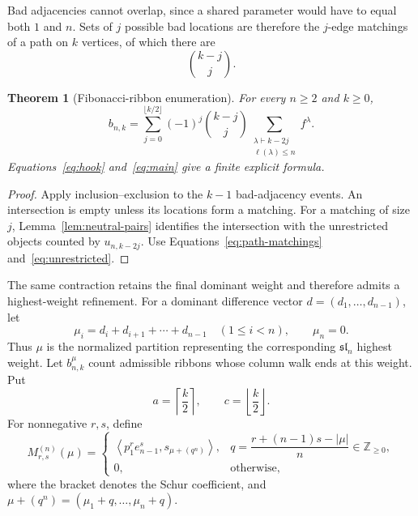 \documentclass[11pt]{article}
\newtheorem{theorem}{Theorem}[section]
\theoremstyle{definition}
\newcommand{\ellp}{\ell}
\begin{document}
Bad adjacencies cannot overlap, since a shared parameter would have to equal
both $1$ and $n$.  Sets of $j$ possible bad locations are therefore the
$j$-edge matchings of a path on $k$ vertices, of which there are
\begin{equation}\label{eq:path-matchings}
 \binom{k-j}{j}.
\end{equation}

\begin{theorem}[Fibonacci-ribbon enumeration]\label{thm:main}
For every $n\ge2$ and $k\ge0$,
\begin{equation}\label{eq:main}
 \boxed{
 b_{n,k}=\sum_{j=0}^{\lfloor k/2\rfloor}(-1)^j
 \binom{k-j}{j}
 \sum_{\substack{\lambda\vdash k-2j\\\ellp(\lambda)\le n}}f^\lambda.}
\end{equation}
Equations~\eqref{eq:hook} and~\eqref{eq:main} give a finite explicit formula.
\end{theorem}

\begin{proof}
Apply inclusion--exclusion to the $k-1$ bad-adjacency events.  An intersection
is empty unless its locations form a matching.  For a matching of size $j$,
Lemma~\ref{lem:neutral-pairs} identifies the intersection with the
unrestricted objects counted by $u_{n,k-2j}$.  Use
Equations~\eqref{eq:path-matchings} and~\eqref{eq:unrestricted}.
\end{proof}

The same contraction retains the final dominant weight and therefore admits
a highest-weight refinement.  For a dominant difference vector
$d=(d_1,\ldots,d_{n-1})$, let
\[
 \mu_i=d_i+d_{i+1}+\cdots+d_{n-1}\quad(1\le i<n),
 \qquad \mu_n=0.
\]
Thus $\mu$ is the normalized partition representing the corresponding
$\mathfrak{sl}_n$ highest weight.  Let $b_{n,k}^{\mu}$ count admissible
ribbons whose column walk ends at this weight.  Put
\[
 a=\left\lceil\frac{k}{2}\right\rceil,
 \qquad c=\left\lfloor\frac{k}{2}\right\rfloor.
\]
For nonnegative $r,s$, define
\begin{equation}\label{eq:mixed-schur-multiplicity}
 M_{r,s}^{(n)}(\mu)=
 \begin{cases}
 \left\langle p_1^r e_{n-1}^s,
 s_{\mu+(q^n)}\right\rangle,
 &q=\dfrac{r+(n-1)s-|\mu|}{n}\in\mathbb Z_{\ge0},\\[6pt]
 0,&\text{otherwise},
 \end{cases}
\end{equation}
where the bracket denotes the Schur coefficient, and
$\mu+(q^n)=(\mu_1+q,\ldots,\mu_n+q)$.
\end{document}
